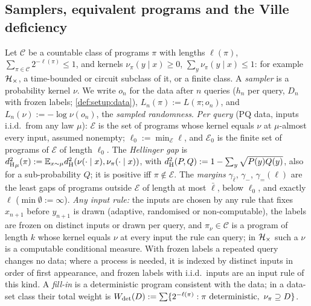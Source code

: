 \subsection{Samplers, equivalent programs and the Ville deficiency}\label{sec:split:setting}

\begin{definition}\label{def:split:setting}
Let $\mathcal C$ be a countable class of programs $\pi$ with lengths $\ell(\pi)$, $\sum_{\pi\in\mathcal C}2^{-\ell(\pi)}\le1$, and kernels $\nu_\pi(y\mid x)\ge0$, $\sum_y\nu_\pi(y\mid x)\le1$: for example $\mathcal{H}_{\times}$, a time-bounded or circuit subclass of it, or a finite class. A \emph{sampler} is a probability kernel $\nu$. We write $o_n$ for the data after $n$ queries ($h_n$ per query, $D_n$ with frozen labels; \cref{def:setup:data}), $L_n(\pi):=L(\pi;o_n)$, and $L_n(\nu):=-\log\nu(o_n)$, the \emph{sampled randomness}.
\emph{Per query} (PQ data, inputs i.i.d.\ from any law $\mu$): $\mathcal E$ is the set of programs whose kernel equals $\nu$ at $\mu$-almost every input, assumed nonempty; $\ell_0:=\min_{\mathcal E}\ell$, and $\mathcal E_0$ is the finite set of programs of $\mathcal E$ of length $\ell_0$. The \emph{Hellinger gap} is ${d_{\mathrm{H}}^{2}}_\mu(\pi):=\mathbb{E}_{x\sim\mu}d_{\mathrm{H}}^{2}(\nu(\cdot\mid x),\nu_\pi(\cdot\mid x))$, with $d_{\mathrm{H}}^{2}(P,Q):=1-\sum_y\sqrt{P(y)Q(y)}$, also for a sub-probability $Q$; it is positive iff $\pi\notin\mathcal E$. The \emph{margins} $\gamma_{\bar\ell}$, $\gamma_-$, $\gamma_=(\ell)$ are the least gaps of programs outside $\mathcal E$ of length at most $\bar\ell$, below $\ell_0$, and exactly $\ell$ ($\min\emptyset:=\infty$).
\emph{Any input rule:} the inputs are chosen by any rule that fixes $x_{n+1}$ before $y_{n+1}$ is drawn (adaptive, randomised or non-computable), the labels are frozen on distinct inputs or drawn per query, and $\pi_\nu\in\mathcal C$ is a program of length $k$ whose kernel equals $\nu$ at every input the rule can query; in $\mathcal{H}_{\times}$ such a $\nu$ is a computable conditional measure. With frozen labels a repeated query changes no data; where a process is needed, it is indexed by distinct inputs in order of first appearance, and frozen labels with i.i.d.\ inputs are an input rule of this kind.
A \emph{fill-in} is a deterministic program consistent with the data; in a data-set class their total weight is $W_{\mathrm{det}}(D):=\sum\{2^{-\ell(\pi)}:\pi\text{ deterministic},\ \nu_\pi\supseteq D\}$.
\end{definition}

